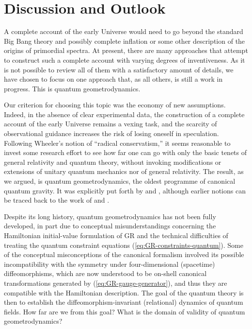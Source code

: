 \documentclass[12pt]{iopart}
\def\eref#1{(\ref{eq:#1})}
\begin{document}
\section{\label{sec:outlook}Discussion and Outlook}
A complete account of the early Universe would need to go beyond the standard Big Bang theory and possibly complete inflation or some other description of the origins of primordial spectra. At present, there are many approaches that attempt to construct such a complete account with varying degrees of inventiveness. As it is not possible to review all of them with a satisfactory amount of details, we have chosen to focus on one approach that, as all others, is still a work in progress. This is quantum geometrodynamics.

Our criterion for choosing this topic was the economy of new assumptions. Indeed, in the absence of clear experimental data, the construction of a complete account of the early Universe remains a vexing task, and the scarcity of observational guidance increases the risk of losing oneself in speculation. Following Wheeler's notion of ``radical conservatism,'' it seems reasonable to invest some research effort to see how far one can go with only the basic tenets of general relativity and quantum theory, without invoking modifications or extensions of unitary quantum mechanics nor of general relativity. The result, as we argued, is quantum geometrodynamics, the oldest programme of canonical quantum gravity. It was explicitly put forth by \citet{DeWitt:1967yk} and \citet{Wheeler:1968iap}, although earlier notions can be traced back to the work of \citet{ADM,Dirac:1958sc,Bergmann:1972ud} and \citet{Rosenfeld}.

Despite its long history, quantum geometrodynamics has not been fully developed, in part due to conceptual misunderstandings concerning the Hamiltonian initial-value formulation of GR and the technical difficulties of treating the quantum constraint equations \eref{GR-constraints-quantum}. Some of the conceptual misconceptions of the canonical formalism involved its possible incompatibility with the symmetry under four-dimensional (spacetime) diffeomorphisms, which are now understood to be on-shell canonical transformations generated by \eref{GR-gauge-generator}, and thus they are compatible with the Hamiltonian description. The goal of the quantum theory is then to establish the diffeomorphism-invariant (relational) dynamics of quantum fields. How far are we from this goal? What is the domain of validity of quantum geometrodynamics?
\end{document}
